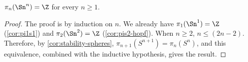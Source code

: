 %
\begin{thm}\label{thm:pinsn}
$\pi_n(\Sn^n)=\Z$ for every $n\geq 1$.
\end{thm}

\begin{proof}
The proof is by induction on $n$.  We already have $\pi_1(\Sn ^1) = \Z$
(\cref{cor:pi1s1}) and $\pi_2(\Sn ^2) = \Z$ (\cref{cor:pis2-hopf}).
When $n \ge 2$, $n \le (2n - 2)$. Therefore, by
\cref{cor:stability-spheres}, $\pi_{n+1}(S^{n+1}) = \pi_{n}(S^{n})$, and
this equivalence, combined with the inductive hypothesis, gives the result.
\end{proof}

